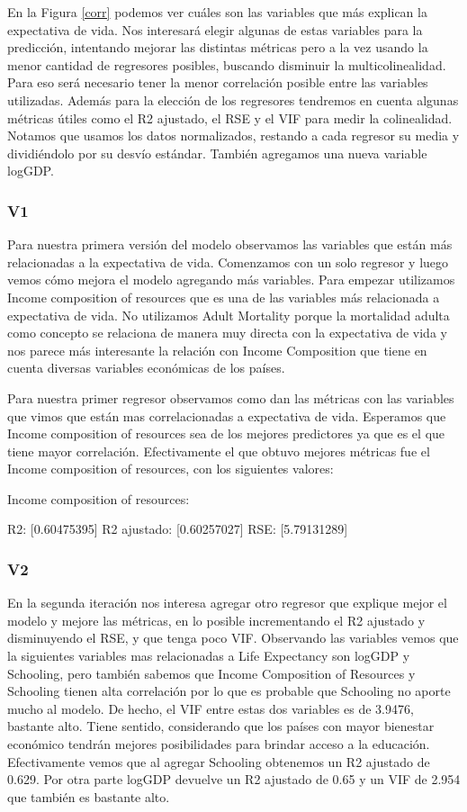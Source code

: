 En la Figura \ref{corr} podemos ver cuáles son las variables que más explican la expectativa de vida. Nos interesará elegir algunas de estas variables para la predicción, intentando mejorar las distintas métricas pero a la vez usando la menor cantidad de regresores posibles, buscando disminuir la multicolinealidad. Para eso será necesario tener la menor correlación posible entre las variables utilizadas. Además para la elección de los regresores tendremos en cuenta algunas métricas útiles como el R2 ajustado, el RSE y el VIF para medir la colinealidad. Notamos que usamos los datos normalizados, restando a cada regresor su media y dividiéndolo por su desvío estándar. También agregamos una nueva variable logGDP.


\subsubsection{V1}

Para nuestra primera versión del modelo observamos las variables que están más relacionadas a la expectativa de vida. Comenzamos con un solo regresor y luego vemos cómo mejora el modelo agregando más variables. Para empezar utilizamos Income composition of resources que es una de las variables más relacionada a expectativa de vida. No utilizamos Adult Mortality porque la mortalidad adulta como concepto se relaciona de manera muy directa con la expectativa de vida y nos parece más interesante la relación con Income Composition que tiene en cuenta diversas variables económicas de los países.

Para nuestra primer regresor observamos como dan las métricas con las variables que vimos que están mas correlacionadas a expectativa de vida. Esperamos que Income composition of resources sea de los mejores predictores ya que es el que tiene mayor correlación. Efectivamente el que obtuvo mejores métricas fue el Income composition of resources, con los siguientes valores:

Income composition of resources:

R2: [0.60475395]
R2 ajustado: [0.60257027]
RSE: [5.79131289]



\subsubsection{V2}

En la segunda iteración nos interesa agregar otro regresor que explique mejor el modelo y mejore las métricas, en lo posible incrementando el R2 ajustado y disminuyendo el RSE, y que tenga poco VIF. Observando las variables vemos que la siguientes variables mas relacionadas a Life Expectancy son logGDP y Schooling, pero también sabemos que Income Composition of Resources y Schooling tienen alta correlación por lo que es probable que Schooling no aporte mucho al modelo. De hecho, el VIF entre estas dos variables es de 3.9476, bastante alto. Tiene sentido, considerando que los países con mayor bienestar económico tendrán mejores posibilidades para brindar acceso a la educación. Efectivamente vemos que al agregar Schooling obtenemos un R2 ajustado de 0.629. Por otra parte logGDP devuelve un R2 ajustado de 0.65 y un VIF de 2.954 que también es bastante alto.

